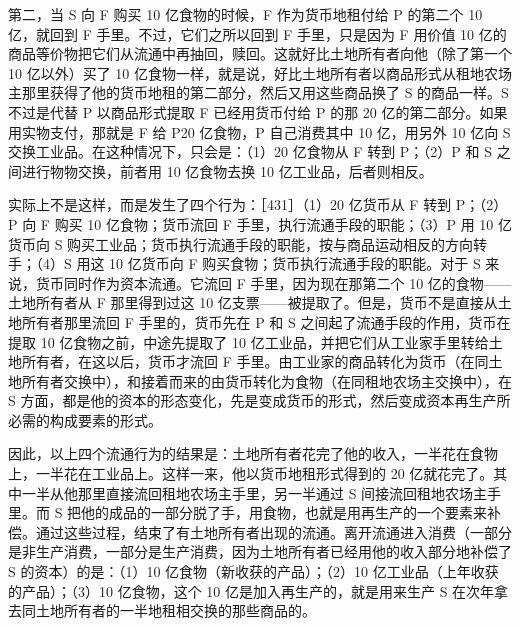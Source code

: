 第二，当 S 向 F 购买 10 亿食物的时候，F 作为货币地租付给 P 的第二个 10 亿，就回到 F 手里。不过，它们之所以回到 F 手里，只是因为 F 用价值 10 亿的商品等价物把它们从流通中再抽回，赎回。这就好比土地所有者向他（除了第一个 10 亿以外）买了 10 亿食物一样，就是说，好比土地所有者以商品形式从租地农场主那里获得了他的货币地租的第二部分，然后又用这些商品换了 S 的商品一样。S 不过是代替 P 以商品形式提取 F 已经用货币付给 P 的那 20 亿的第二部分。如果用实物支付，那就是 F 给 P20 亿食物，P 自己消费其中 10 亿，用另外 10 亿向 S 交换工业品。在这种情况下，只会是：（1）20 亿食物从 F 转到 P；（2）P 和 S 之间进行物物交换，前者用 10 亿食物去换 10 亿工业品，后者则相反。

实际上不是这样，而是发生了四个行为：［431］（1）20 亿货币从 F 转到 P；（2）P 向 F 购买 10 亿食物；货币流回 F 手里，执行流通手段的职能；（3）P 用 10 亿货币向 S 购买工业品；货币执行流通手段的职能，按与商品运动相反的方向转手；（4）S 用这 10 亿货币向 F 购买食物；货币执行流通手段的职能。对于 S 来说，货币同时作为资本流通。它流回 F 手里，因为现在那第二个 10 亿的食物——土地所有者从 F 那里得到过这 10 亿支票——被提取了。但是，货币不是直接从土地所有者那里流回 F 手里的，货币先在 P 和 S 之间起了流通手段的作用，货币在提取 10 亿食物之前，中途先提取了 10 亿工业品，并把它们从工业家手里转给土地所有者，在这以后，货币才流回 F 手里。由工业家的商品转化为货币（在同土地所有者交换中），和接着而来的由货币转化为食物（在同租地农场主交换中），在 S 方面，都是他的资本的形态变化，先是变成货币的形式，然后变成资本再生产所必需的构成要素的形式。

因此，以上四个流通行为的结果是：土地所有者花完了他的收入，一半花在食物上，一半花在工业品上。这样一来，他以货币地租形式得到的 20 亿就花完了。其中一半从他那里直接流回租地农场主手里，另一半通过 S 间接流回租地农场主手里。而 S 把他的成品的一部分脱了手，用食物，也就是用再生产的一个要素来补偿。通过这些过程，结束了有土地所有者出现的流通。离开流通进入消费（一部分是非生产消费，一部分是生产消费，因为土地所有者已经用他的收入部分地补偿了 S 的资本）的是：（1）10 亿食物（新收获的产品）；（2）10 亿工业品（上年收获的产品）；（3）10 亿食物，这个 10 亿是加入再生产的，就是用来生产 S 在次年拿去同土地所有者的一半地租相交换的那些商品的。

